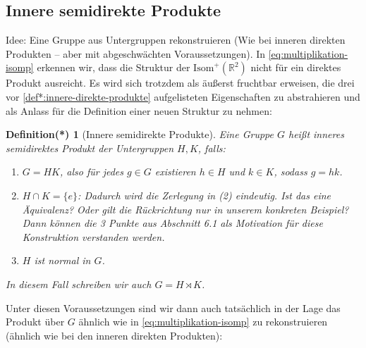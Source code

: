 \documentclass[a4paper, ngerman]{article}
\newcounter{chapter}
\numberwithin{equation}{chapter}
\theoremstyle{plain}
\newtheorem{definitionstrd}{Definition(*)}[chapter]
\theoremstyle{definition}
\newcommand{\anm}[1]{{\color{red} #1}}
\begin{document}
\subsection{Innere semidirekte Produkte}\label{subsec:innere-semidirekte-produkte}
Idee: Eine Gruppe aus Untergruppen rekonstruieren (Wie bei inneren direkten Produkten -- aber mit abgeschwächten Voraussetzungen). In \eqref{eq:multiplikation-isomp} erkennen wir, dass die Struktur der \(\mathrm{Isom}^+(\mathbb R^2)\) nicht für ein direktes Produkt ausreicht. Es wird sich trotzdem als äußerst fruchtbar erweisen, die drei vor \cref{def*:innere-direkte-produkte} aufgelisteten Eigenschaften zu abstrahieren und als Anlass für die Definition einer neuen Struktur zu nehmen:

\begin{definitionstrd}[Innere semidirekte Produkte]\label{def*:innere-semidirekte-produkte}
    Eine Gruppe \(G\) heißt \emph{inneres semidirektes Produkt} der Untergruppen \(H, K\), falls: 
    \begin{enumerate}
        \item \(G = HK\), also für jedes \(g \in G\) existieren \(h \in H\) und \(k \in K\), sodass \(g = hk\). %
        \item \(H\cap K = \{e\}\): Dadurch wird die Zerlegung in (2) eindeutig. \anm{Ist das eine Äquivalenz? Oder gilt die Rückrichtung nur in unserem konkreten Beispiel? Dann können die 3 Punkte aus Abschnitt 6.1 als Motivation für diese Konstruktion verstanden werden.} 
    
        \item \(H\) ist normal in \(G\). 
    \end{enumerate}
    In diesem Fall schreiben wir auch \(G = H \rtimes K\). 
\end{definitionstrd}
Unter diesen Voraussetzungen sind wir dann auch tatsächlich in der Lage das Produkt über \(G\) ähnlich wie in \eqref{eq:multiplikation-isomp} zu rekonstruieren (ähnlich wie bei den inneren direkten Produkten): 
\end{document}
